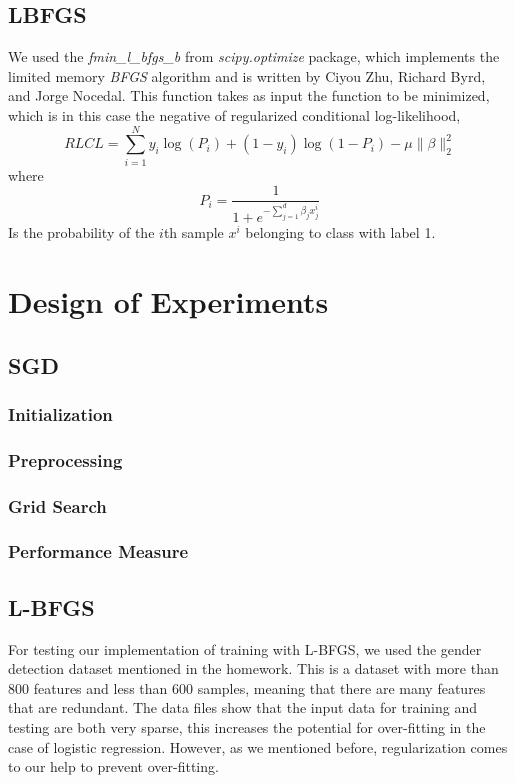 \documentclass[twoside,12pt]{article}
\begin{document}
\subsection{LBFGS}
We used the {\it fmin\_l\_bfgs\_b} from { \it scipy.optimize} package, which implements the limited memory {\it BFGS} algorithm and is written by Ciyou Zhu, Richard Byrd, and Jorge Nocedal. This function takes as input the function to be minimized, which is in this case the negative of regularized conditional log-likelihood,
\begin{equation}
RLCL = \sum_{i=1}^N y_i \log(P_i) + (1-y_i)\log(1 - P_i) - \mu \|\beta\|_2^2
\end{equation}
where 
\begin{equation}
P_i = \frac{1}{1+e^{-\sum_{j=1}^d \beta_j x^i_j}}
\end{equation}
Is the probability of the $i$th sample $x^i$ belonging to class with label 1. 
\section{Design of Experiments}
\subsection{SGD}
\subsubsection{Initialization}
\subsubsection{Preprocessing}
\subsubsection{Grid Search}
\subsubsection{Performance Measure}

\subsection{L-BFGS}
For testing our implementation of training with L-BFGS, we used the gender detection dataset mentioned in the homework. This is a dataset with more than 800 features and less than 600 samples, meaning that there are many features that are redundant. The data files show that the input data for training and testing are both very sparse, this increases the potential for over-fitting in the case of logistic regression. However, as we mentioned before, regularization comes to our help to prevent over-fitting.
\end{document}
